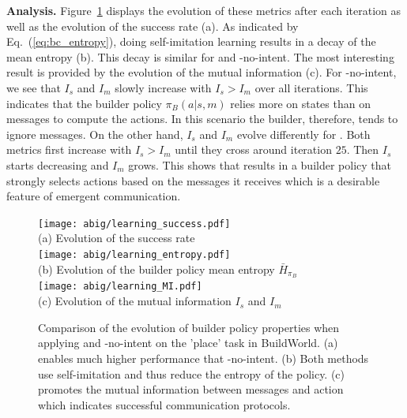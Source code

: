 \textbf{Analysis. } Figure~\ref{sup:fig_learning_metrics} displays the evolution of these metrics after each iteration as well as the evolution of the success rate (a). As indicated by Eq.~(\ref{eq:bc_entropy}), doing self-imitation learning results in a decay of the mean entropy (b). This decay is similar for \abig and \abig-no-intent. The most interesting result is provided by the evolution of the mutual information (c). For \abig-no-intent, we see that $I_s$ and $I_m$ slowly increase with $I_s>I_m$ over all iterations. This indicates that the builder policy $\pi_B(a|s,m)$ relies more on states than on messages to compute the actions. In this scenario the builder, therefore, tends to ignore messages. On the other hand, $I_s$ and $I_m$ evolve differently for \abig. Both metrics first increase with $I_s>I_m$ until they cross around iteration $25$. Then $I_s$ starts decreasing and $I_m$  grows. This shows that \abig results in a builder policy that strongly selects actions based on the messages it receives which is a desirable feature of emergent communication.  

\begin{figure}[h!]
    \centering
    \texttt{[image: abig/learning\_success.pdf]}\\
    \small(a) Evolution of the success rate\\
    \texttt{[image: abig/learning\_entropy.pdf]}\\
    \small(b) Evolution of the builder policy mean entropy $\bar{H}_{\pi_B}$\\
    \texttt{[image: abig/learning\_MI.pdf]}\\
    \small(c) Evolution of the mutual information $I_s$ and $I_m$
    \caption{Comparison of the evolution of builder policy properties when applying \abig and \abig-no-intent on the 'place' task in BuildWorld. (a) \abig enables much higher performance that \abig-no-intent. (b) Both methods use self-imitation and thus reduce the entropy of the policy. (c) \abig promotes the mutual information between messages and action which indicates successful communication protocols.}
    \label{sup:fig_learning_metrics}
\end{figure}

